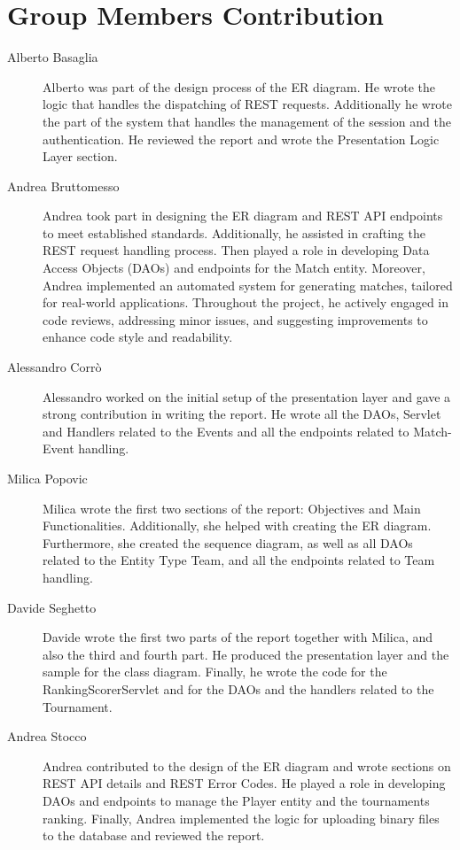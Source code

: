 \section{Group Members Contribution}

\begin{description}
	\item[Alberto Basaglia]
Alberto was part of the design process of the ER diagram.
He wrote the logic that handles the dispatching of REST requests.
Additionally he wrote the part of the system that handles the management of the session and the authentication.
He reviewed the report and wrote the Presentation Logic Layer section.
	\item[Andrea Bruttomesso]
Andrea took part in designing the ER diagram and REST API endpoints to meet established standards.
Additionally, he assisted in crafting the REST request handling process.
Then played a role in developing Data Access Objects (DAOs) and endpoints for the Match entity. Moreover, Andrea implemented an automated system for generating matches, tailored for real-world applications.
Throughout the project, he actively engaged in code reviews, addressing minor issues, and suggesting improvements to enhance code style and readability.
	\item[Alessandro Corrò]
Alessandro worked on the initial setup of the presentation layer and gave a strong contribution in writing the report.
He wrote all the DAOs, Servlet and Handlers related to the Events and all the endpoints related to Match-Event handling.
	\item[Milica Popovic]
Milica wrote the first two sections of the report: Objectives and Main Functionalities.
Additionally, she helped with creating the ER diagram.
Furthermore, she created the sequence diagram, as well as all DAOs related to the Entity Type Team, and all the endpoints related to Team handling.
	\item[Davide Seghetto]
Davide wrote the first two parts of the report together with Milica, and also the third and fourth part.
He produced the presentation layer and the sample for the class diagram. Finally, he wrote the code for the RankingScorerServlet and for the DAOs
and the handlers related to the Tournament.
	\item[Andrea Stocco]
 Andrea contributed to the design of the ER diagram and wrote sections on REST API details and REST Error Codes.
He played a role in developing DAOs and endpoints to manage the Player entity and the tournaments ranking.
Finally, Andrea implemented the logic for uploading binary files to the database and reviewed the report.
\end{description}
